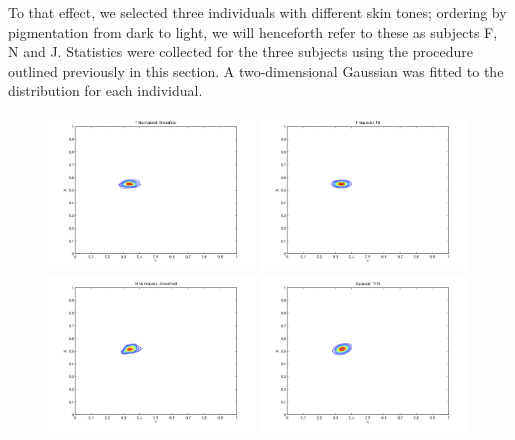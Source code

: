 To that effect, we selected three individuals with different skin tones; ordering by pigmentation from dark to light, we will henceforth refer to these as subjects F, N and J. Statistics were collected for the three subjects using the procedure outlined previously in this section. A two-dimensional Gaussian was fitted to the distribution for each individual.

\begin{figure}[h!]
  \centering
    \includegraphics[width=0.49\textwidth]{Chapter3/Figs/FHands_XY_fBin.jpg}
    \includegraphics[width=0.49\textwidth]{Chapter3/Figs/FHands_XY_gFit.jpg}
    \includegraphics[width=0.49\textwidth]{Chapter3/Figs/NHands_XY_fBin.jpg}
    \includegraphics[width=0.49\textwidth]{Chapter3/Figs/NHands_XY_gFit.jpg}

\end{figure}
